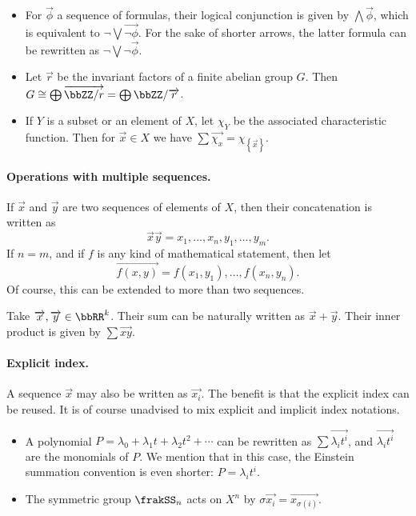 \documentclass[a4paper, 8pt]{article}
\begin{document}
\begin{multicols}{2}
\begin{examples*}
	\begin{itemize}
		\item For $\overrightarrow{\phi}$ a sequence of formulas, their logical conjunction is given by $\bigwedge \overrightarrow{\phi}$, which is equivalent to $\neg \bigvee \overrightarrow{\neg \phi}$. For the sake of shorter arrows, the latter formula can be rewritten as $\neg \bigvee \neg \overrightarrow{\phi}$.
		\item Let $\overrightarrow{r}$ be the invariant factors of a finite abelian group $G$. Then $G \cong \bigoplus \overrightarrow{\bbZZ / r} = \bigoplus \bbZZ / \overrightarrow{r}$.
		\item If $Y$ is a subset or an element of $X$, let $\chi_Y$ be the associated characteristic function. Then for $\overrightarrow{x} \in X$ we have $\sum \overrightarrow{\chi_x} = \chi_{\left\lbrace\overrightarrow{x}\right\rbrace}$.
	\end{itemize}
\end{examples*}

\paragraph{Operations with multiple sequences.} If $\overrightarrow{x}$ and $\overrightarrow{y}$ are two sequences of elements of $X$, then their concatenation is written as
\[ \overrightarrow{x} \overrightarrow{y} = x_1, \ldots, x_n, y_1, \ldots, y_m . \]
If $n = m$, and if $f$ is any kind of mathematical statement, then let
\[ \overrightarrow{f (x, y)} = f (x_1, y_1), \ldots, f (x_n, y_n) . \]
Of course, this can be extended to more than two sequences.

\begin{example*}
	Take $\overrightarrow{x}, \overrightarrow{y} \in \bbRR^k$. Their sum can be naturally written as $\overrightarrow{x} + \overrightarrow{y}$. Their inner product is given by $\sum \overrightarrow{x y}$.
\end{example*}

\paragraph{Explicit index.} A sequence $\overrightarrow{x}$ may also be written as $\overrightarrow{x_i}$. The benefit is that the explicit index can be reused. It is of course unadvised to mix explicit and implicit index notations.

\begin{examples*}
	\begin{itemize}
		\item A polynomial $P = \lambda_0 + \lambda_1 t + \lambda_2 t^2 + \cdots$ can be rewritten as $\sum \overrightarrow{\lambda_i t^i}$, and $\overrightarrow{\lambda_i t^i}$ are the monomials of $P$. We mention that in this case, the Einstein summation convention is even shorter: $P = \lambda_i t^i$.
		\item The symmetric group $\frakSS_n$ acts on $X^n$ by $\sigma \overrightarrow{x_i} = \overrightarrow{x_{\sigma (i)}}$.
	\end{itemize}
\end{examples*}


\end{multicols}
\end{document}

